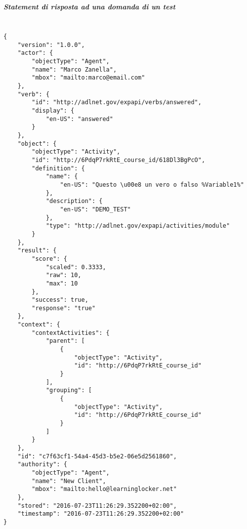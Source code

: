     \subparagraph*{Statement di risposta ad una domanda di un test\\\\}
    \begin{lstlisting}
{
    "version": "1.0.0",
    "actor": {
        "objectType": "Agent",
        "name": "Marco Zanella",
        "mbox": "mailto:marco@email.com"
    },
    "verb": {
        "id": "http://adlnet.gov/expapi/verbs/answered",
        "display": {
            "en-US": "answered"
        }
    },
    "object": {
        "objectType": "Activity",
        "id": "http://6PdqP7rkRtE_course_id/618Dl3BgPcO",
        "definition": {
            "name": {
                "en-US": "Questo \u00e8 un vero o falso %Variable1%"
            },
            "description": {
                "en-US": "DEMO_TEST"
            },
            "type": "http://adlnet.gov/expapi/activities/module"
        }
    },
    "result": {
        "score": {
            "scaled": 0.3333,
            "raw": 10,
            "max": 10
        },
        "success": true,
        "response": "true"
    },
    "context": {
        "contextActivities": {
            "parent": [
                {
                    "objectType": "Activity",
                    "id": "http://6PdqP7rkRtE_course_id"
                }
            ],
            "grouping": [
                {
                    "objectType": "Activity",
                    "id": "http://6PdqP7rkRtE_course_id"
                }
            ]
        }
    },
    "id": "c7f63cf1-54a4-45d3-b5e2-06e5d2561860",
    "authority": {
        "objectType": "Agent",
        "name": "New Client",
        "mbox": "mailto:hello@learninglocker.net"
    },
    "stored": "2016-07-23T11:26:29.352200+02:00",
    "timestamp": "2016-07-23T11:26:29.352200+02:00"
}
    \end{lstlisting}

